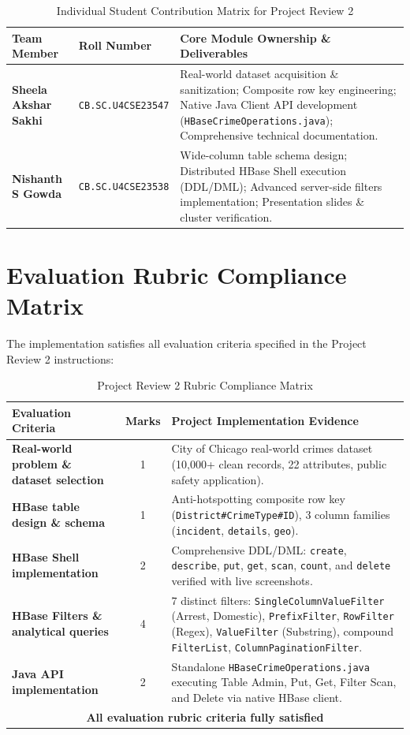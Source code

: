 \documentclass[12pt, a4paper]{article}
\begin{document}
\begin{table}[H]
\centering
\caption{Individual Student Contribution Matrix for Project Review 2}
\label{tab:contributions}
\begin{tabular}{p{4.2cm}p{3.5cm}p{7.3cm}}
\toprule
\textbf{Team Member} & \textbf{Roll Number} & \textbf{Core Module Ownership \& Deliverables} \\
\midrule
\textbf{Sheela Akshar Sakhi} & \texttt{CB.SC.U4CSE23547} & Real-world dataset acquisition \& sanitization; Composite row key engineering; Native Java Client API development (\texttt{HBaseCrimeOperations.java}); Comprehensive technical documentation. \\
\addlinespace[0.2cm]
\textbf{Nishanth S Gowda} & \texttt{CB.SC.U4CSE23538} & Wide-column table schema design; Distributed HBase Shell execution (DDL/DML); Advanced server-side filters implementation; Presentation slides \& cluster verification. \\
\bottomrule
\end{tabular}
\end{table}

\section{Evaluation Rubric Compliance Matrix}
The implementation satisfies all evaluation criteria specified in the Project Review 2 instructions:
\begin{table}[H]
\centering
\caption{Project Review 2 Rubric Compliance Matrix}
\begin{tabular}{p{5.2cm}cp{7.6cm}}
\toprule
\textbf{Evaluation Criteria} & \textbf{Marks} & \textbf{Project Implementation Evidence} \\
\midrule
\textbf{Real-world problem \& dataset selection} & 1 & City of Chicago real-world crimes dataset (10,000+ clean records, 22 attributes, public safety application). \\
\textbf{HBase table design \& schema} & 1 & Anti-hotspotting composite row key (\texttt{District\#CrimeType\#ID}), 3 column families (\texttt{incident}, \texttt{details}, \texttt{geo}). \\
\textbf{HBase Shell implementation} & 2 & Comprehensive DDL/DML: \texttt{create}, \texttt{describe}, \texttt{put}, \texttt{get}, \texttt{scan}, \texttt{count}, and \texttt{delete} verified with live screenshots. \\
\textbf{HBase Filters \& analytical queries} & 4 & 7 distinct filters: \texttt{SingleColumnValueFilter} (Arrest, Domestic), \texttt{PrefixFilter}, \texttt{RowFilter} (Regex), \texttt{ValueFilter} (Substring), compound \texttt{FilterList}, \texttt{ColumnPaginationFilter}. \\
\textbf{Java API implementation} & 2 & Standalone \texttt{HBaseCrimeOperations.java} executing Table Admin, Put, Get, Filter Scan, and Delete via native HBase client. \\
\midrule
\multicolumn{3}{c}{\textbf{All evaluation rubric criteria fully satisfied}} \\
\bottomrule
\end{tabular}
\end{table}
\end{document}
